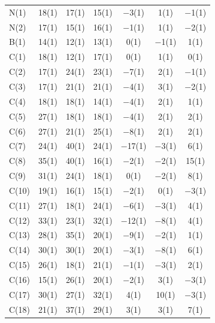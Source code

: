 \onecolumn
\begin{center}
\tablelasttail{\bottomrule}
{\footnotesize \singlespacing
\begin{supertabular}{lcccccc}
N(1)&18(1) &17(1)&15(1) &$-$3(1)&1(1) &$-$1(1)\\
N(2)&17(1) &15(1)&16(1) &$-$1(1)&1(1) &$-$2(1)\\
B(1)&14(1) &12(1)&13(1) &0(1)&$-$1(1) &1(1)\\
C(1)&18(1) &12(1)&17(1) &0(1)&1(1) &0(1)\\
C(2)&17(1) &24(1)&23(1) &$-$7(1)&2(1) &$-$1(1)\\
C(3)&17(1) &21(1)&21(1) &$-$4(1)&3(1) &$-$2(1)\\
C(4)&18(1) &18(1)&14(1) &$-$4(1)&2(1) &1(1)\\
C(5)&27(1) &18(1)&18(1) &$-$4(1)&2(1) &2(1)\\
C(6)&27(1) &21(1)&25(1) &$-$8(1)&2(1) &2(1)\\
C(7)&24(1) &40(1)&24(1) &$-$17(1)&$-$3(1) &6(1)\\
C(8)&35(1) &40(1)&16(1) &$-$2(1)&$-$2(1) &15(1)\\
C(9)&31(1) &24(1)&18(1) &0(1)&$-$2(1) &8(1)\\
C(10)&19(1) &16(1)&15(1) &$-$2(1)&0(1) &$-$3(1)\\
C(11)&27(1) &18(1)&24(1) &$-$6(1)&$-$3(1) &4(1)\\
C(12)&33(1) &23(1)&32(1) &$-$12(1)&$-$8(1) &4(1)\\
C(13)&28(1) &35(1)&20(1) &$-$9(1)&$-$2(1) &1(1)\\
C(14)&30(1) &30(1)&20(1) &$-$3(1)&$-$8(1) &6(1)\\
C(15)&26(1) &18(1)&21(1) &$-$1(1)&$-$3(1) &2(1)\\
C(16)&15(1) &26(1)&20(1) &$-$2(1)&3(1) &$-$3(1)\\
C(17)&30(1) &27(1)&32(1) &4(1)&10(1) &$-$3(1)\\
C(18)&21(1) &37(1)&29(1) &3(1)&3(1) &7(1)\\

\end{supertabular}}
\end{center}
